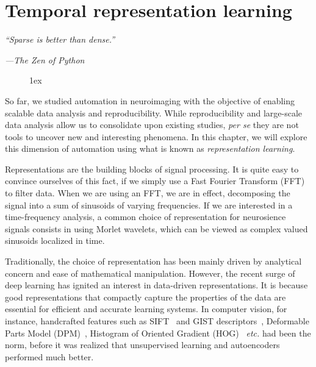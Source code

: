 \chapter{Temporal representation learning}
\label{chapter:alphacsc}

\epigraph{\small\itshape \hspace{100pt} ``Sparse is better than dense.''}{\small\textit{---The Zen of Python}}

\begin{figure}[ht!]
\centering
\begingroup
\etocstandardlines
\renewcommand{\etocbelowtocskip}{0pt\relax}
\fboxsep1ex
\localtableofcontents
\endgroup
\end{figure}

\clearpage
So far, we studied automation in neuroimaging with the objective of enabling scalable data analysis and reproducibility. While  reproducibility and large-scale data analysis allow us to consolidate upon existing studies, \emph{per se} they are not tools to uncover new and interesting phenomena. In this chapter, we will explore this dimension of automation using what is known as \emph{representation learning}.

Representations are the building blocks of signal processing. It is quite easy to convince ourselves of this fact, if we simply use a Fast Fourier Transform (FFT) to filter data. When we are using an FFT, we are in effect, decomposing the signal into a sum of sinusoids of varying frequencies. If we are interested in a time-frequency analysis, a common choice of representation for neurosience signals consists in using Morlet wavelets, which can be viewed as complex valued sinusoids localized in time.

Traditionally, the choice of representation has been mainly driven by analytical concern and ease of mathematical manipulation. However, the recent surge of deep learning has ignited an interest in data-driven representations. It is because good representations  that compactly capture the properties of the data are essential for efficient and accurate learning systems. In computer vision, for instance, handcrafted features such as SIFT~\citep{lowe1999object} and GIST descriptors~\citep{oliva2001modeling}, Deformable Parts Model (DPM)~\citep{felzenszwalb2010object}, Histogram of Oriented Gradient (HOG)~\citep{dalal2005histograms} \emph{etc.} had been the norm, before it was realized that unsupervised learning and autoencoders performed much better.


